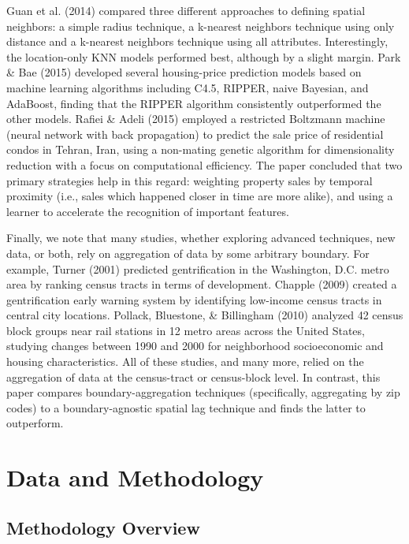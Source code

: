 \documentclass[conference,final,]{IEEEtran}
\begin{document}
Guan et al. (2014) compared three different approaches to defining
spatial neighbors: a simple radius technique, a k-nearest neighbors
technique using only distance and a k-nearest neighbors technique using
all attributes. Interestingly, the location-only KNN models performed
best, although by a slight margin. Park \& Bae (2015) developed several
housing-price prediction models based on machine learning algorithms
including C4.5, RIPPER, naive Bayesian, and AdaBoost, finding that the
RIPPER algorithm consistently outperformed the other models. Rafiei \&
Adeli (2015) employed a restricted Boltzmann machine (neural network
with back propagation) to predict the sale price of residential condos
in Tehran, Iran, using a non-mating genetic algorithm for dimensionality
reduction with a focus on computational efficiency. The paper concluded
that two primary strategies help in this regard: weighting property
sales by temporal proximity (i.e., sales which happened closer in time
are more alike), and using a learner to accelerate the recognition of
important features.

Finally, we note that many studies, whether exploring advanced
techniques, new data, or both, rely on aggregation of data by some
arbitrary boundary. For example, Turner (2001) predicted gentrification
in the Washington, D.C. metro area by ranking census tracts in terms of
development. Chapple (2009) created a gentrification early warning
system by identifying low-income census tracts in central city
locations. Pollack, Bluestone, \& Billingham (2010) analyzed 42 census
block groups near rail stations in 12 metro areas across the United
States, studying changes between 1990 and 2000 for neighborhood
socioeconomic and housing characteristics. All of these studies, and
many more, relied on the aggregation of data at the census-tract or
census-block level. In contrast, this paper compares
boundary-aggregation techniques (specifically, aggregating by zip codes)
to a boundary-agnostic spatial lag technique and finds the latter to
outperform.

\hypertarget{data-and-methodology}{%
\section{Data and Methodology}\label{data-and-methodology}}

\hypertarget{methodology-overview}{%
\subsection{Methodology Overview}\label{methodology-overview}}
\end{document}
